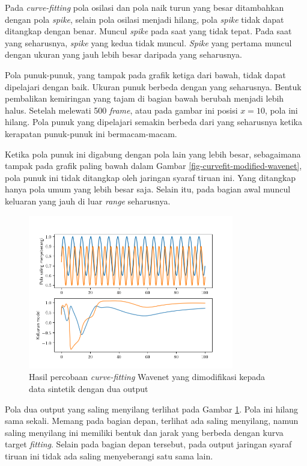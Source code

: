 Pada \textit{curve-fitting} pola osilasi dan pola naik turun yang besar ditambahkan dengan pola \textit{spike}, selain pola osilasi menjadi hilang, pola \textit{spike} tidak dapat ditangkap dengan benar. Muncul \textit{spike} pada saat yang tidak tepat. Pada saat yang seharusnya, \textit{spike} yang kedua tidak muncul. \textit{Spike} yang pertama muncul dengan ukuran yang jauh lebih besar daripada yang seharusnya.

Pola punuk-punuk, yang tampak pada grafik ketiga dari bawah, tidak dapat dipelajari dengan baik. Ukuran punuk berbeda dengan yang seharusnya. Bentuk pembalikan kemiringan yang tajam di bagian bawah berubah menjadi lebih halus. Setelah melewati 500 \textit{frame}, atau pada gambar ini posisi $x=10$, pola ini hilang. Pola punuk yang dipelajari semakin berbeda dari yang seharusnya ketika kerapatan punuk-punuk ini bermacam-macam.

Ketika pola punuk ini digabung dengan pola lain yang lebih besar, sebagaimana tampak pada grafik paling bawah dalam Gambar \ref{fig-curvefit-modified-wavenet}, pola punuk ini tidak ditangkap oleh jaringan syaraf tiruan ini. Yang ditangkap hanya pola umum yang lebih besar saja. Selain itu, pada bagian awal muncul keluaran yang jauh di luar \textit{range} seharusnya.

\begin{figure}[htbp]
    \centering
    \includegraphics[width=0.8\textwidth]{resources/analisis_modified_wavenet_two_outputs.png}
    \caption{Hasil percobaan \textit{curve-fitting} Wavenet yang dimodifikasi kepada data sintetik dengan dua output}\label{fig-curvefit-modified-wavenet-two-outputs}
\end{figure}

Pola dua output yang saling menyilang terlihat pada Gambar \ref{fig-curvefit-modified-wavenet-two-outputs}. Pola ini hilang sama sekali. Memang pada bagian depan, terlihat ada saling menyilang, namun saling menyilang ini memiliki bentuk dan jarak yang berbeda dengan kurva target \textit{fitting}. Selain pada bagian depan tersebut, pada output jaringan syaraf tiruan ini tidak ada saling menyeberangi satu sama lain.

